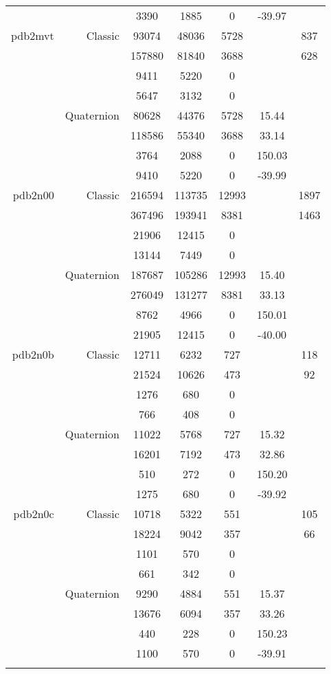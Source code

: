 \begin{xltabular}{\textwidth}{r|rcccSc}
& & 3390 & 1885 & 0 & -39.97 & \\ \addlinespace
pdb2mvt & Classic & 93074 & 48036 & 5728 & & 837 \\
& & 157880 & 81840 & 3688 & & 628 \\
& & 9411 & 5220 & 0 & & \\
& & 5647 & 3132 & 0 & & \\
& Quaternion & 80628 & 44376 & 5728 & 15.44 & \\
& & 118586 & 55340 & 3688 & 33.14 & \\
& & 3764 & 2088 & 0 & 150.03 & \\
& & 9410 & 5220 & 0 & -39.99 & \\ \addlinespace
pdb2n00 & Classic & 216594 & 113735 & 12993 & & 1897 \\
& & 367496 & 193941 & 8381 & & 1463 \\
& & 21906 & 12415 & 0 & & \\
& & 13144 & 7449 & 0 & & \\
& Quaternion & 187687 & 105286 & 12993 & 15.40 & \\
& & 276049 & 131277 & 8381 & 33.13 & \\
& & 8762 & 4966 & 0 & 150.01 & \\
& & 21905 & 12415 & 0 & -40.00 & \\ \addlinespace
pdb2n0b & Classic & 12711 & 6232 & 727 & & 118 \\
& & 21524 & 10626 & 473 & & 92 \\
& & 1276 & 680 & 0 & & \\
& & 766 & 408 & 0 & & \\
& Quaternion & 11022 & 5768 & 727 & 15.32 & \\
& & 16201 & 7192 & 473 & 32.86 & \\
& & 510 & 272 & 0 & 150.20 & \\
& & 1275 & 680 & 0 & -39.92 & \\ \addlinespace
pdb2n0c & Classic & 10718 & 5322 & 551 & & 105 \\
& & 18224 & 9042 & 357 & & 66 \\
& & 1101 & 570 & 0 & & \\
& & 661 & 342 & 0 & & \\
& Quaternion & 9290 & 4884 & 551 & 15.37 & \\
& & 13676 & 6094 & 357 & 33.26 & \\
& & 440 & 228 & 0 & 150.23 & \\
& & 1100 & 570 & 0 & -39.91 & \\ \addlinespace

\end{xltabular}

